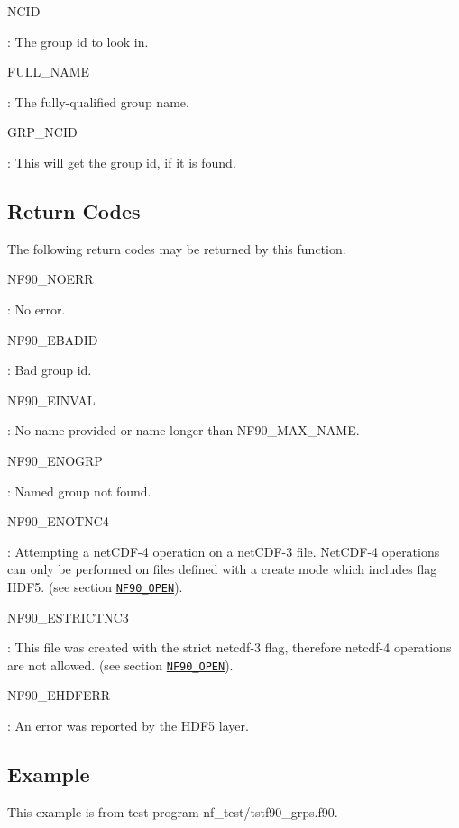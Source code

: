 {\ttfamily N\+C\+ID}

\+: The group id to look in.

{\ttfamily F\+U\+L\+L\+\_\+\+N\+A\+ME}

\+: The fully-\/qualified group name.

{\ttfamily G\+R\+P\+\_\+\+N\+C\+ID}

\+: This will get the group id, if it is found.

\subsection*{Return Codes}

The following return codes may be returned by this function.

{\ttfamily N\+F90\+\_\+\+N\+O\+E\+RR}

\+: No error.

{\ttfamily N\+F90\+\_\+\+E\+B\+A\+D\+ID}

\+: Bad group id.

{\ttfamily N\+F90\+\_\+\+E\+I\+N\+V\+AL}

\+: No name provided or name longer than N\+F90\+\_\+\+M\+A\+X\+\_\+\+N\+A\+ME.

{\ttfamily N\+F90\+\_\+\+E\+N\+O\+G\+RP}

\+: Named group not found.

{\ttfamily N\+F90\+\_\+\+E\+N\+O\+T\+N\+C4}

\+: Attempting a net\+C\+D\+F-\/4 operation on a net\+C\+D\+F-\/3 file. Net\+C\+D\+F-\/4 operations can only be performed on files defined with a create mode which includes flag H\+D\+F5. (see section \href{#NF90_005fOPEN}{\tt N\+F90\+\_\+\+O\+P\+EN}).

{\ttfamily N\+F90\+\_\+\+E\+S\+T\+R\+I\+C\+T\+N\+C3}

\+: This file was created with the strict netcdf-\/3 flag, therefore netcdf-\/4 operations are not allowed. (see section \href{#NF90_005fOPEN}{\tt N\+F90\+\_\+\+O\+P\+EN}).

{\ttfamily N\+F90\+\_\+\+E\+H\+D\+F\+E\+RR}

\+: An error was reported by the H\+D\+F5 layer.

\subsection*{Example}

This example is from test program nf\+\_\+test/tstf90\+\_\+grps.\+f90.


